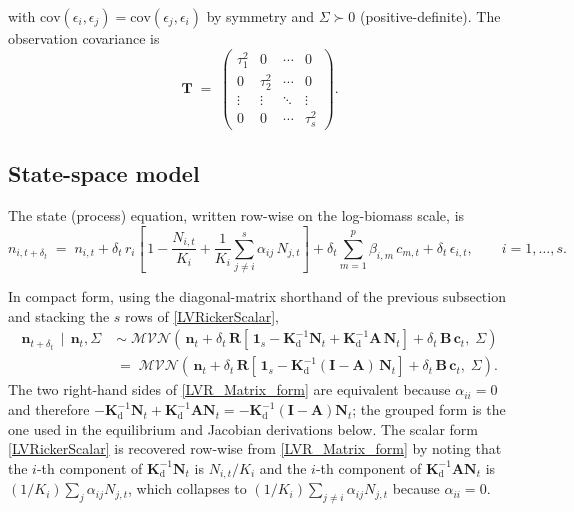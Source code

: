 \documentclass[12pt]{article}
\begin{document}
with $\mathrm{cov}(\epsilon_{i},\epsilon_{j})=\mathrm{cov}(\epsilon_{j},\epsilon_{i})$ by symmetry and $\Sigma\succ 0$ (positive-definite). The observation covariance is
\begin{equation*}
	\mathbf{T} \;=\; \begin{pmatrix}
		\tau_{1}^{2} & 0 & \cdots & 0 \\
		0 & \tau_{2}^{2} & \cdots & 0 \\
		\vdots & \vdots & \ddots & \vdots \\
		0 & 0 & \cdots & \tau_{s}^{2}
	\end{pmatrix}.
\end{equation*}

\subsection{State-space model}

The state (process) equation, written row-wise on the log-biomass scale, is
\begin{equation}\label{LVRickerScalar}
	n_{i,t+\delta_{t}} \;=\; n_{i,t} + \delta_{t}\, r_{i}\!\left[\,1 - \frac{N_{i,t}}{K_{i}} + \frac{1}{K_{i}}\sum_{j\neq i}^{s}\alpha_{ij}\, N_{j,t}\right] + \delta_{t}\sum_{m=1}^{p}\beta_{i,m}\,c_{m,t} + \delta_{t}\,\epsilon_{i,t}, \qquad i=1,\ldots,s.
\end{equation}

In compact form, using the diagonal-matrix shorthand of the previous subsection and stacking the $s$ rows of \eqref{LVRickerScalar},
\begin{equation}\label{LVR_Matrix_form}
	\begin{aligned}
		\mathbf{n}_{t+\delta_{t}}\,\mid\,\mathbf{n}_{t},\Sigma \;&\sim\; \mathcal{MVN}\!\left(\, \mathbf{n}_{t} + \delta_{t}\,\mathbf{R}\!\left[\,\mathbf{1}_{s} - \mathbf{K}_{\mathrm{d}}^{-1}\mathbf{N}_{t} + \mathbf{K}_{\mathrm{d}}^{-1}\mathbf{A}\,\mathbf{N}_{t}\right] + \delta_{t}\,\mathbf{B}\,\mathbf{c}_{t},\; \Sigma\right) \\
		&=\; \mathcal{MVN}\!\left(\, \mathbf{n}_{t} + \delta_{t}\,\mathbf{R}\!\left[\,\mathbf{1}_{s} - \mathbf{K}_{\mathrm{d}}^{-1}(\mathbf{I}-\mathbf{A})\,\mathbf{N}_{t}\right] + \delta_{t}\,\mathbf{B}\,\mathbf{c}_{t},\; \Sigma\right).
	\end{aligned}
\end{equation}
The two right-hand sides of \eqref{LVR_Matrix_form} are equivalent because $\alpha_{ii}=0$ and therefore $-\mathbf{K}_{\mathrm{d}}^{-1}\mathbf{N}_{t}+\mathbf{K}_{\mathrm{d}}^{-1}\mathbf{A}\mathbf{N}_{t}=-\mathbf{K}_{\mathrm{d}}^{-1}(\mathbf{I}-\mathbf{A})\mathbf{N}_{t}$; the grouped form is the one used in the equilibrium and Jacobian derivations below. The scalar form \eqref{LVRickerScalar} is recovered row-wise from \eqref{LVR_Matrix_form} by noting that the $i$-th component of $\mathbf{K}_{\mathrm{d}}^{-1}\mathbf{N}_{t}$ is $N_{i,t}/K_{i}$ and the $i$-th component of $\mathbf{K}_{\mathrm{d}}^{-1}\mathbf{A}\mathbf{N}_{t}$ is $(1/K_{i})\sum_{j}\alpha_{ij}N_{j,t}$, which collapses to $(1/K_{i})\sum_{j\neq i}\alpha_{ij}N_{j,t}$ because $\alpha_{ii}=0$.
\end{document}
